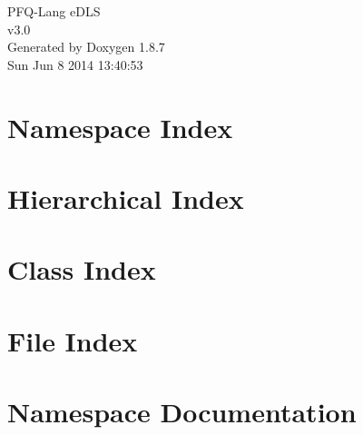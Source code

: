 \documentclass[twoside]{book}
\newcommand{\+}{\discretionary{\mbox{\scriptsize$\hookleftarrow$}}{}{}}
\newcommand{\clearemptydoublepage}{%
  \newpage{\pagestyle{empty}\cleardoublepage}%
}
\begin{document}
\hypersetup{pageanchor=false,
             bookmarks=true,
             bookmarksnumbered=true,
             pdfencoding=unicode
            }
\begin{titlepage}
\vspace*{7cm}
\begin{center}%
{\Large P\+F\+Q-\/\+Lang e\+D\+L\+S \\[1ex]\large v3.\+0 }\\
\vspace*{1cm}
{\large Generated by Doxygen 1.8.7}\\
\vspace*{0.5cm}
{\small Sun Jun 8 2014 13:40:53}\\
\end{center}
\end{titlepage}
\clearemptydoublepage
\tableofcontents
\clearemptydoublepage
{}
\hypersetup{pageanchor=true}

\chapter{Namespace Index}

\chapter{Hierarchical Index}

\chapter{Class Index}

\chapter{File Index}

\chapter{Namespace Documentation}


\end{document}
